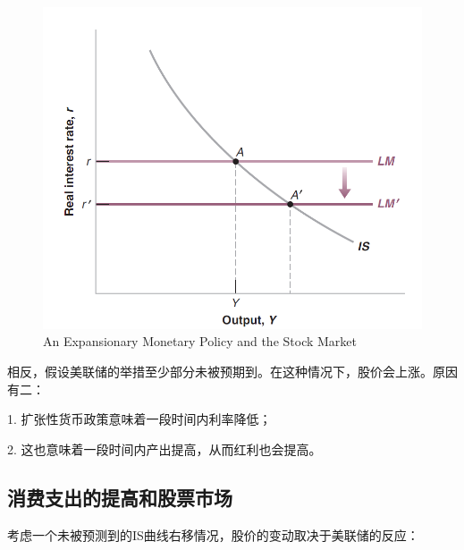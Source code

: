 \documentclass{article}
\begin{document}
\begin{figure}[H] %
	\centering %
	\includegraphics[width=1\textwidth]{14_1} %
	\caption{An Expansionary
		Monetary Policy and the
		Stock Market} %
	\label{Fig.main2} %
\end{figure}

相反，假设美联储的举措至少部分未被预期到。在这种情况下，股价会上涨。原因有二：

1. 扩张性货币政策意味着一段时间内利率降低；

2. 这也意味着一段时间内产出提高，从而红利也会提高。

\subsection{消费支出的提高和股票市场}

考虑一个未被预测到的IS曲线右移情况，股价的变动取决于美联储的反应：
\end{document}
